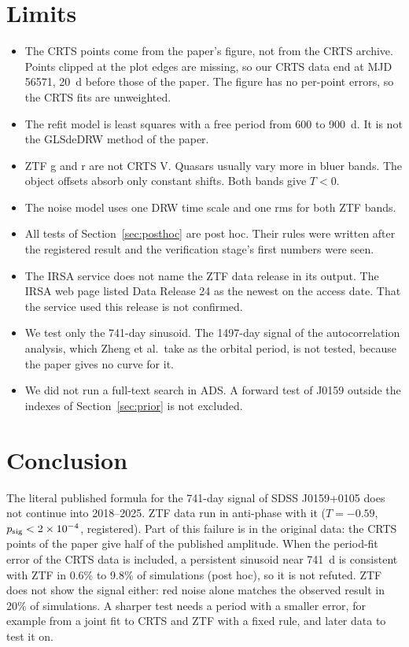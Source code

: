 \documentclass[11pt]{article}
\newcommand{\psig}{p_{\rm sig}}
\begin{document}
\section{Limits}
\label{sec:scope}

\begin{itemize}
\item The CRTS points come from the paper's figure, not from the CRTS archive. Points clipped at the plot edges are missing, so our CRTS data end at MJD 56571, 20~d before those of the paper. The figure has no per-point errors, so the CRTS fits are unweighted.
\item The refit model is least squares with a free period from 600 to 900~d. It is not the GLSdeDRW method of the paper.
\item ZTF g and r are not CRTS V. Quasars usually vary more in bluer bands. The object offsets absorb only constant shifts. Both bands give $T < 0$.
\item The noise model uses one DRW time scale and one rms for both ZTF bands.
\item All tests of Section~\ref{sec:posthoc} are post hoc. Their rules were written after the registered result and the verification stage's first numbers were seen.
\item The IRSA service does not name the ZTF data release in its output. The IRSA web page listed Data Release 24 as the newest on the access date. That the service used this release is not confirmed.
\item We test only the 741-day sinusoid. The 1497-day signal of the autocorrelation analysis, which Zheng et al.\ take as the orbital period, is not tested, because the paper gives no curve for it.
\item We did not run a full-text search in ADS. A forward test of J0159 outside the indexes of Section~\ref{sec:prior} is not excluded.
\end{itemize}

\section{Conclusion}

The literal published formula for the 741-day signal of SDSS J0159+0105 does not continue into 2018--2025. ZTF data run in anti-phase with it ($T = -0.59$, $\psig < 2\times10^{-4}$, registered). Part of this failure is in the original data: the CRTS points of the paper give half of the published amplitude. When the period-fit error of the CRTS data is included, a persistent sinusoid near 741~d is consistent with ZTF in 0.6\% to 9.8\% of simulations (post hoc), so it is not refuted. ZTF does not show the signal either: red noise alone matches the observed result in 20\% of simulations. A sharper test needs a period with a smaller error, for example from a joint fit to CRTS and ZTF with a fixed rule, and later data to test it on.
\end{document}
